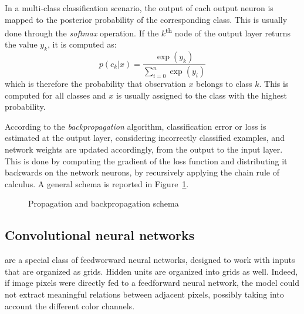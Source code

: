 \documentclass[%
    corpo=12pt,
    twoside,
    stile=classica,   
    tipotesi=magistrale,
    evenboxes,
    english,
	numerazioneromana,
]{toptesi}
\begin{document}
\medskip
In a multi-class classification scenario, the output of each output neuron is mapped to the posterior probability of the corresponding class. This is usually done through the \textit{softmax} operation. If the $k$\textsuperscript{th} node of the output layer returns the value $y_k$, it is computed as:
\begin{equation*}
	p(c_k|x) = \frac{\exp{(y_k)}}{\sum_{i=0}^n \exp{(y_i)}}
\end{equation*}
which is therefore the probability that observation $x$ belongs to class $k$. This is computed for all classes and $x$ is usually assigned to the class with the highest probability.

\medskip
According to the \textit{backpropagation} algorithm, classification error or loss is estimated at the output layer, considering incorrectly classified examples, and network weights are updated accordingly, from the output to the input layer. This is done by computing the gradient of the loss function and distributing it backwards on the network neurons, by recursively applying the chain rule of calculus\cite{goodfellow2016deep}. A general schema is reported in Figure~\ref{fig:forwardbackward}.

\begin{figure}[ht]
	\centering
	\caption{Propagation and backpropagation schema}
	\label{fig:forwardbackward}
\end{figure}

\subsection{Convolutional neural networks}
 are a special class of feedworward neural networks, designed to work with inputs that are organized as grids. Hidden units are organized into grids as well. Indeed, if image pixels were directly fed to a feedforward neural network, the model could not extract meaningful relations between adjacent pixels, possibly taking into account the different color channels.
\end{document}
